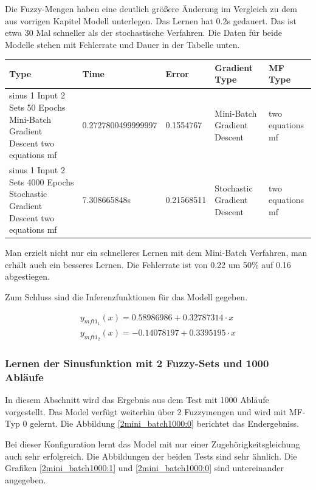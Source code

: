 Die Fuzzy-Mengen haben eine deutlich größere Änderung im Vergleich zu dem aus vorrigen Kapitel Modell unterlegen. Das Lernen hat 0.2s gedauert. Das ist etwa 30 Mal schneller als der stochastische Verfahren. Die Daten für beide Modelle stehen mit Fehlerrate und Dauer in der Tabelle unten.

\begin{center}\label{tab2_50MB}
	\begin{tabular}{ | p{3cm} | l | l | p{3cm} | p{3cm} |}
		\hline
		Type & Time & Error & Gradient Type & MF Type \\ \hline
		sinus 1 Input 2 Sets 50 Epochs Mini-Batch Gradient Descent two equations mf&0.2727800499999997&0.1554767&Mini-Batch Gradient Descent&two equations mf\\ \hline
		sinus 1 Input 2 Sets 4000 Epochs Stochastic Gradient Descent two equations mf&7.308665848s&0.21568511&Stochastic Gradient Descent&two equations mf
		\\ \hline
	\end{tabular}
\end{center}

Man erzielt nicht nur ein schnelleres Lernen mit dem Mini-Batch Verfahren, man erhält auch ein besseres Lernen. Die Fehlerrate ist von 0.22 um 50\% auf 0.16 abgestiegen.

Zum Schluss sind die Inferenzfunktionen für das Modell gegeben.


\begin{align}
	y_{mft1_1}(x) = 0.58986986 + 0.32787314\cdot x \\
	y_{mft1_2}(x) = -0.14078197 + 0.3395195\cdot x
\end{align}

\subsubsection{Lernen der Sinusfunktion mit 2 Fuzzy-Sets und 1000 Abläufe}
In diesem Abschnitt wird das Ergebnis aus dem Test mit 1000 Abläufe vorgestellt. Das Model verfügt weiterhin über 2 Fuzzymengen und wird mit MF-Typ 0 gelernt. Die Abbildung \ref{2mini_batch1000:0} berichtet das Endergebniss.

Bei dieser Konfiguration lernt das Model mit nur einer Zugehörigkeitsgleichung auch sehr erfolgreich. Die Abbildungen der beiden Tests sind sehr ähnlich. Die Grafiken \ref{2mini_batch1000:1} und \ref{2mini_batch1000:0} sind untereinander angegeben.

